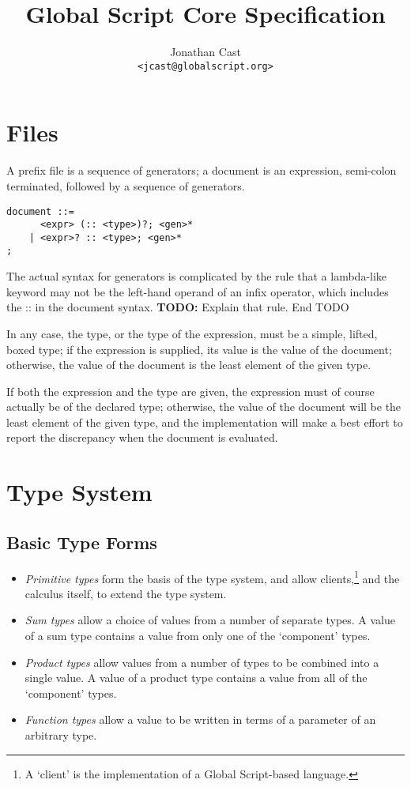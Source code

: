 \documentclass{report}
\title{Global Script Core Specification}
\author{Jonathan Cast\\\texttt{<jcast@globalscript.org>}}
\newcommand\defn[1]{\emph{#1}}
\newcommand\todo[1]{\textbf{TODO: }#1 End TODO}
\begin{document}
\maketitle

\tableofcontents

\chapter{Files}

A prefix file is a sequence of generators; a document is an expression, semi-colon terminated, followed by a sequence of generators.

\begin{verbatim}
document ::=
      <expr> (:: <type>)?; <gen>*
    | <expr>? :: <type>; <gen>*
;
\end{verbatim}

The actual syntax for generators is complicated by the rule that a lambda-like keyword may not be the left-hand operand of an infix operator,
which includes the \<::\> in the document syntax.
\todo{Explain that rule.}

In any case, the type, or the type of the expression, must be a simple, lifted, boxed type;
if the expression is supplied, its value is the value of the document;
otherwise, the value of the document is the least element of the given type.

If both the expression and the type are given, the expression must of course actually be of the declared type;
otherwise, the value of the document will be the least element of the given type,
and the implementation will make a best effort to report the discrepancy when the document is evaluated.

\chapter{Type System}

\section{Basic Type Forms}

\begin{itemize}
    \item \defn{Primitive types} form the basis of the type system, and
    allow clients,\footnote{A `client' is the implementation of a Global Script-based language.}
    and the calculus itself,
    to extend the type system.

    \item \defn{Sum types} allow a choice of values from a number of separate types.
        A value of a sum type contains a value from only one of the `component' types.

    \item \defn{Product types} allow values from a number of types to be combined into a single value.
        A value of a product type contains a value from all of the `component' types.

    \item \defn{Function types} allow a value to be written in terms of a parameter of an arbitrary type.
\end{itemize}
\end{document}
